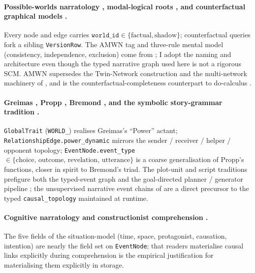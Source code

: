 \documentclass[11pt]{article}
\begin{document}
\paragraph{Possible-worlds narratology
\citep{ryan1991possible,ryan2001virtual,dolezel1998heterocosmica,
pavel1986fictional}, modal-logical roots
\citep{lewis1973causation}, and counterfactual graphical models
\citep{balke1994counterfactual,shpitser2008complete,
correa2021nested,correa2025amwn}.} Every node and edge carries
$\texttt{world\_id} \in \{\text{factual}, \text{shadow}\}$;
counterfactual queries fork a sibling \texttt{VersionRow}.
The AMWN tag and three-rule mental model (consistency,
independence, exclusion) come from \citet{correa2025amwn}; I
adopt the naming and architecture even though the typed narrative
graph used here is not a rigorous SCM. AMWN supersedes the Twin-Network
construction \citep{balke1994counterfactual} and the multi-network
machinery of \citet{shpitser2008complete}, and is the
counterfactual-completeness counterpart to do-calculus
\citep{pearl1995causal,pearl2009causality,bareinboim2022pearl}.

\paragraph{Greimas \citep{greimas1983structural}, Propp
\citep{propp1968morphology}, Bremond \citep{bremond1973logique},
and the symbolic story-grammar tradition
\citep{rumelhart1975schema,mandlerjohnson1977,kintsch1978macro,
schank1977scripts,lehnert1981plotunits,meehan1977talespin,
perez2001mexica,bringsjord2000brutus,chambers2008narrative}.}
\texttt{GlobalTrait} (\texttt{WORLD\_}) realises Greimas's ``Power''
actant; \texttt{RelationshipEdge.power\_dynamic} mirrors the
sender / receiver / helper / opponent topology;
\texttt{EventNode.event\_type} $\in \{\text{choice, outcome,
revelation, utterance}\}$ is a coarse generalisation of Propp's
functions,
closer in spirit to Bremond's triad. The plot-unit and script
traditions prefigure both the typed-event graph
\citep{schank1977scripts,lehnert1981plotunits} and the
goal-directed planner / generator pipeline
\citep{meehan1977talespin,perez2001mexica}; the unsupervised
narrative event chains of \citet{chambers2008narrative} are a direct
precursor to the typed \texttt{causal\_topology} maintained at
runtime.

\paragraph{Cognitive narratology
\citep{herman2002story,fludernik1996natural,zwaan1998situation,
gerrig1993narrative} and constructionist comprehension
\citep{trabasso1985causal,graesser1994constructing,kintsch1978macro}.}
The five fields of the situation-model (time, space, protagonist,
causation, intention) are nearly the field set on \texttt{EventNode};
that readers materialise causal links explicitly during
comprehension is the empirical justification for materialising them
explicitly in storage.
\end{document}
